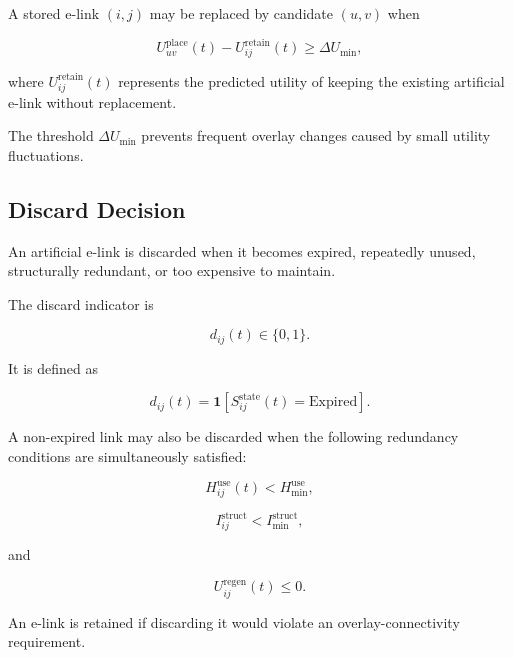A stored e-link $(i,j)$ may be replaced by candidate $(u,v)$ when

\begin{equation}
    U_{uv}^{\mathrm{place}}(t)
    -
    U_{ij}^{\mathrm{retain}}(t)
    \geq
    \Delta U_{\min},
\end{equation}

where $U_{ij}^{\mathrm{retain}}(t)$ represents the predicted utility of keeping the existing artificial e-link without replacement.

The threshold $\Delta U_{\min}$ prevents frequent overlay changes caused by small utility fluctuations.


\subsection{Discard Decision}

An artificial e-link is discarded when it becomes expired, repeatedly unused, structurally redundant, or too expensive to maintain.

The discard indicator is

\begin{equation}
    d_{ij}(t)
    \in
    \{0,1\}.
\end{equation}

It is defined as

\begin{equation}
    d_{ij}(t)
    =
    \mathbf{1}
    \left[
    S_{ij}^{\mathrm{state}}(t)
    =
    \mathrm{Expired}
    \right].
\end{equation}

A non-expired link may also be discarded when the following redundancy conditions are simultaneously satisfied:

\begin{equation}
    H_{ij}^{\mathrm{use}}(t)
    <
    H_{\min}^{\mathrm{use}},
\end{equation}

\begin{equation}
    I_{ij}^{\mathrm{struct}}
    <
    I_{\min}^{\mathrm{struct}},
\end{equation}

and

\begin{equation}
    U_{ij}^{\mathrm{regen}}(t)
    \leq
    0.
\end{equation}

An e-link is retained if discarding it would violate an overlay-connectivity requirement.

